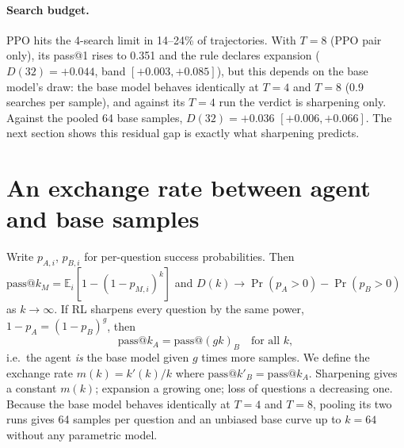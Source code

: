 \documentclass[11pt]{article}
\makeatletter
\newcommand{\passk}{\mathrm{pass@}k}
\makeatother
\begin{document}
\paragraph{Search budget.} PPO hits the 4-search limit in 14--24\% of trajectories. With $T = 8$ (PPO pair only), its pass@1 rises to 0.351 and the rule declares expansion ($D(32) = +0.044$, band $[+0.003, +0.085]$), but this depends on the base model's draw: the base model behaves identically at $T = 4$ and $T = 8$ (0.9 searches per sample), and against its $T = 4$ run the verdict is sharpening only. Against the pooled 64 base samples, $D(32) = +0.036$ $[+0.006, +0.066]$. The next section shows this residual gap is exactly what sharpening predicts.

\section{An exchange rate between agent and base samples}\label{sec:exchange}

Write $p_{A,i}$, $p_{B,i}$ for per-question success probabilities. Then $\passk_M = \mathbb{E}_i[1-(1-p_{M,i})^k]$ and $D(k) \to \Pr(p_A>0) - \Pr(p_B>0)$ as $k\to\infty$. If RL sharpens every question by the same power, $1-p_A = (1-p_B)^g$, then
\begin{equation}
\passk_A = \mathrm{pass@}(g k)_B \quad \text{for all } k,
\end{equation}
i.e.\ the agent \emph{is} the base model given $g$ times more samples. We define the exchange rate $m(k) = k'(k)/k$ where $\mathrm{pass@}k'_B = \passk_A$. Sharpening gives a constant $m(k)$; expansion a growing one; loss of questions a decreasing one. Because the base model behaves identically at $T = 4$ and $T = 8$, pooling its two runs gives 64 samples per question and an unbiased base curve up to $k = 64$ without any parametric model.

\begin{table}[t]\centering\small
{}
\caption{Exchange rate: one agent sample is worth $m(k)$ base samples (95\% bootstrap intervals over questions; the upper bound at $k=32$ is truncated by the 64 available base samples). Calibrated on $k = 1$ only, pure sharpening predicts the agent's pass@32.}\label{tab:exchange}
\end{table}
\end{document}
